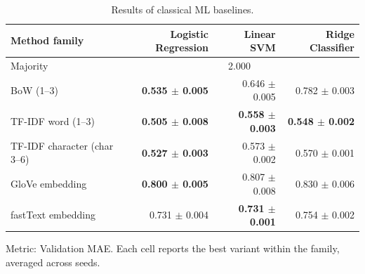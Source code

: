 \begin{table}[htbp]
\centering
\scriptsize
\setlength{\tabcolsep}{3pt}
\caption{Results of classical ML baselines.}
\label{tab:classic-baselines}
\begin{tabular}{lrrr}
\toprule
Method family & Logistic Regression & Linear SVM & Ridge Classifier \\
\midrule
Majority & \multicolumn{3}{c}{2.000} \\
BoW (1--3) & \textbf{0.535 $\pm$ 0.005} & 0.646 $\pm$ 0.005 & 0.782 $\pm$ 0.003 \\
TF-IDF word (1--3) & \textbf{0.505 $\pm$ 0.008} & \textbf{0.558 $\pm$ 0.003} & \textbf{0.548 $\pm$ 0.002} \\
TF-IDF character (char 3--6) & \textbf{0.527 $\pm$ 0.003} & 0.573 $\pm$ 0.002 & 0.570 $\pm$ 0.001 \\
GloVe embedding & \textbf{0.800 $\pm$ 0.005} & 0.807 $\pm$ 0.008 & 0.830 $\pm$ 0.006 \\
fastText embedding & 0.731 $\pm$ 0.004 & \textbf{0.731 $\pm$ 0.001} & 0.754 $\pm$ 0.002 \\
\bottomrule
\end{tabular}
\par\smallskip\footnotesize Metric: Validation MAE. Each cell reports the best variant within the family, averaged across seeds.
\end{table}
